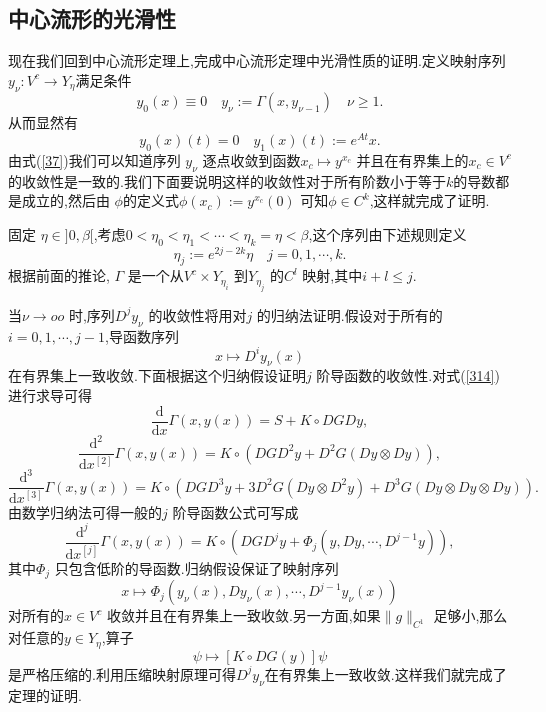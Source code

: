 \subsection{中心流形的光滑性}
现在我们回到中心流形定理上,完成中心流形定理中光滑性质的证明.定义映射序列 $y_\nu:V^{c}\to Y_\eta$满足条件
\[
  y_0(x)\equiv 0 \quad y_\nu := \Gamma (x,y_{\nu-1})\quad \nu\ge 1.		
\] 
从而显然有
\[
  y_0(x)(t)=0 \quad y_1(x)(t):=e^{At}x.	
\] 
由式(\ref{37})我们可以知道序列 $y_\nu$ 逐点收敛到函数$x_c\mapsto y^{x_c}$ 并且在有界集上的$x_c\in V^{c}$ 的收敛性是一致的.我们下面要说明这样的收敛性对于所有阶数小于等于$k$的导数都是成立的,然后由 $\phi$的定义式$\phi(x_c):=y^{x_c}(0)$ 可知$\phi \in  C^{k}$,这样就完成了证明.

固定 $\eta \in ]0,\beta[$,考虑$0<\eta_0<\eta_1<\cdots<\eta_k=\eta<\beta$,这个序列由下述规则定义
\[
\eta_j:=e^{2j-2k}\eta\quad j=0,1,\cdots,k.
\] 
根据前面的推论, $\Gamma$ 是一个从$V^{c}\times Y_{\eta_i}$ 到$Y_{\eta_j}$ 的$C^{l}$ 映射,其中$i+l\le j$.

当$\nu\to oo$ 时,序列$D^{j}y_{\nu}$ 的收敛性将用对$j$ 的归纳法证明.假设对于所有的$i=0,1,\cdots,j-1$,导函数序列
\[
  x\mapsto D^{i}y_{\nu}(x)
\] 在有界集上一致收敛.下面根据这个归纳假设证明$j$ 阶导函数的收敛性.对式(\ref{314})进行求导可得
 \[
   \frac{\mathrm{d}}{\mathrm{d}x}\Gamma(x,y(x))=S+K\circ DG Dy,
\] 
\[
  \frac{\mathrm{d}^{2}}{\mathrm{d}x^{[2]}} \Gamma(x,y(x))=K\circ \left( DG D^2y+D^2G(Dy\otimes Dy) \right),
\]
\[
  \frac{\mathrm{d}^3}{\mathrm{d}x^{[3]}}\Gamma(x,y(x))=K\circ \left( DG D^3y+3D^2G\left( Dy\otimes D^2y \right) +D^3G\left( Dy\otimes Dy\otimes Dy \right)  \right) .
\] 
由数学归纳法可得一般的$j$ 阶导函数公式可写成
\[
  \frac{\mathrm{d}^{j}}{\mathrm{d}x^{[j]}}\Gamma(x,y(x))=K\circ \left( DG D^{j}y+\Phi_j\left( y,Dy,\cdots,D^{j-1}y \right)  \right) ,
\] 
其中$\Phi_j$ 只包含低阶的导函数.归纳假设保证了映射序列
\[
  x\mapsto \Phi_j\left( y_\nu(x),Dy_\nu(x),\cdots,D^{j-1}y_\nu(x) \right) 
\] 对所有的$x\in V^{c}$ 收敛并且在有界集上一致收敛.另一方面,如果$\|g\|_{C^{1}}$ 足够小,那么对任意的$y\in Y_{\eta}$,算子
\[
  \psi\mapsto [K\circ DG(y)]\psi
\] 
是严格压缩的.利用压缩映射原理可得$D^{j}y_{\nu}$在有界集上一致收敛.这样我们就完成了定理的证明.
